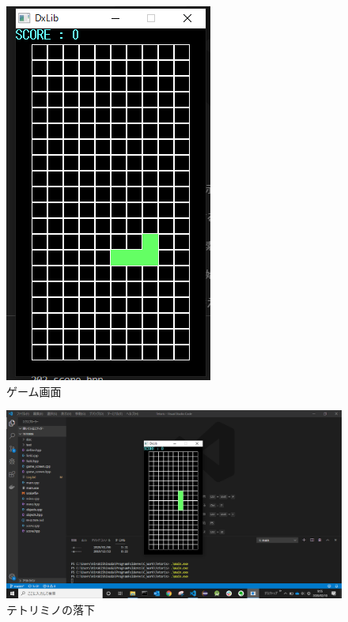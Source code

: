 \begin{figure}[htb]
  \begin{center}
    \includegraphics[scale=0.5]{./soft_img/gamescreen.png}
    \caption{ゲーム画面}
    \label{gamescreen}
  \end{center}
\end{figure}
\begin{figure}[htb]
  \begin{center}
    \includegraphics[scale=0.5]{./soft_img/fall.png}
    \caption{テトリミノの落下}
    \label{fool}
  \end{center}
\end{figure}
